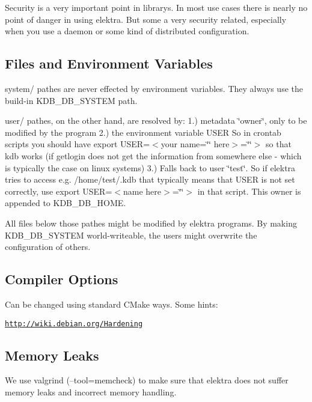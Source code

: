 Security is a very important point in librarys. In most use cases there is nearly no point of danger in using elektra. But some a very security related, especially when you use a daemon or some kind of distributed configuration.

\subsection*{Files and Environment Variables}

system/ pathes are never effected by environment variables. They always use the build-\/in K\+D\+B\+\_\+\+D\+B\+\_\+\+S\+Y\+S\+T\+E\+M path.

user/ pathes, on the other hand, are resolved by\+: 1.) metadata \char`\"{}owner\char`\"{}, only to be modified by the program 2.) the environment variable U\+S\+E\+R So in crontab scripts you should have export U\+S\+E\+R=$<$your name=\char`\"{}\char`\"{} here$>$=\char`\"{}\char`\"{}$>$ so that kdb works (if getlogin does not get the information from somewhere else -\/ which is typically the case on linux systems) 3.) Falls back to user \char`\"{}test\char`\"{}. So if elektra tries to access e.\+g. /home/test/.kdb that typically means that U\+S\+E\+R is not set correctly, use export U\+S\+E\+R=$<$name here$>$=\char`\"{}\char`\"{}$>$ in that script. This owner is appended to K\+D\+B\+\_\+\+D\+B\+\_\+\+H\+O\+M\+E.

All files below those pathes might be modified by elektra programs. By making K\+D\+B\+\_\+\+D\+B\+\_\+\+S\+Y\+S\+T\+E\+M world-\/writeable, the users might overwrite the configuration of others.

\subsection*{Compiler Options}

Can be changed using standard C\+Make ways. Some hints\+:

\href{http://wiki.debian.org/Hardening}{\tt http\+://wiki.\+debian.\+org/\+Hardening}

\subsection*{Memory Leaks}

We use valgrind (--tool=memcheck) to make sure that elektra does not suffer memory leaks and incorrect memory handling. 